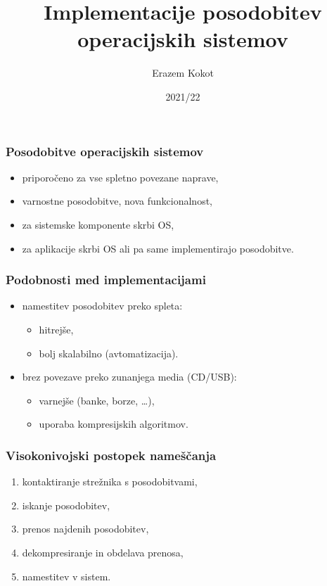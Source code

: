 \documentclass[aspectratio=169]{beamer}
\title{Implementacije posodobitev operacijskih sistemov}
\author{Erazem Kokot}
\institute[FRI]{Sistemska programska oprema,\\Fakulteta za računalništvo in informatiko}
\date{2021/22}
\begin{document}
    \begin{frame}
    \titlepage{}
    \end{frame}

    \begin{frame}
        \frametitle{Posodobitve operacijskih sistemov}
        \begin{itemize}
            \item priporočeno za vse spletno povezane naprave,
            \item varnostne posodobitve, nova funkcionalnost,
            \item za sistemske komponente skrbi OS,
            \item za aplikacije skrbi OS ali pa same implementirajo posodobitve.
        \end{itemize}
    \end{frame}

    \begin{frame}
        \frametitle{Podobnosti med implementacijami}
        \begin{itemize}
            \item namestitev posodobitev preko spleta:
            \begin{itemize}
                \item hitrejše,
                \item bolj skalabilno (avtomatizacija).
            \end{itemize}
            \item brez povezave preko zunanjega media (CD/USB):
            \begin{itemize}
                \item varnejše (banke, borze, \ldots),
                \item uporaba kompresijskih algoritmov.
            \end{itemize}
        \end{itemize}
    \end{frame}

    \begin{frame}
        \frametitle{Visokonivojski postopek nameščanja}
        \begin{enumerate}
            \item kontaktiranje strežnika s posodobitvami,
            \item iskanje posodobitev,
            \item prenos najdenih posodobitev,
            \item dekompresiranje in obdelava prenosa,
            \item namestitev v sistem.
        \end{enumerate}
    \end{frame}
\end{document}
